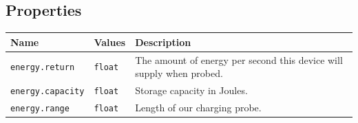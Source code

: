 \documentclass[letter,11pt,twoside]{report}
\begin{document}
\subsection*{Properties}
\begin{tabularx}{\columnwidth}{llX}
\hline Name & Values & Description \\ 
\hline 

\verb'energy.return' & \verb'float' & The amount of energy per second
this device will supply when probed. \\
\verb'energy.capacity' & \verb'float' & Storage capacity in Joules.\\
\verb'energy.range' & \verb'float' & Length of our charging probe.\\
\hline
\end{tabularx}




\end{document}
